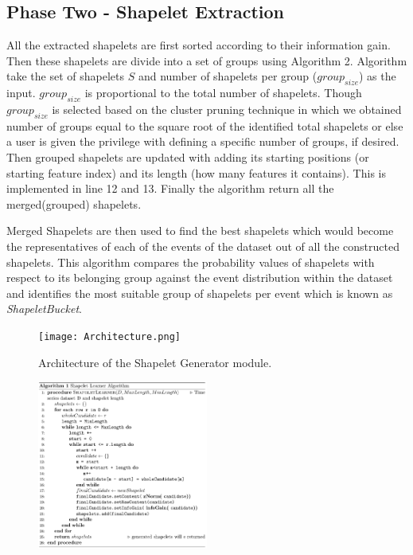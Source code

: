 \documentclass[conference]{IEEEtran}  %
\begin{document}
\subsection{Phase Two - Shapelet Extraction}
All the extracted shapelets are first sorted according to their information gain. Then these shapelets are divide into a set of groups using Algorithm 2. Algorithm take the set of shapelets $S$ and number of shapelets per group ($group_{size}$) as the input. $group_{size}$ is proportional to the total number of shapelets. Though $group_{size}$ is selected based on the cluster pruning technique in which we obtained number of groups equal to the square root of the identified total shapelets or else a user is given the privilege with defining a specific number of groups, if desired. Then grouped shapelets are updated with adding its starting positions (or starting feature index) and its length (how many features it contains). This is implemented in line 12 and 13. Finally the algorithm return all the merged(grouped) shapelets.

Merged Shapelets are then used to find the best shapelets which would become the representatives of each of the events of the dataset out of all the constructed shapelets. This algorithm compares the probability values of shapelets with respect to its belonging group against the event distribution within the dataset and identifies the most suitable group of shapelets per event which is known as \textit{ShapeletBucket}.

\begin{figure}
\texttt{[image: Architecture.png]}
\caption{Architecture of the Shapelet Generator module.}
\label{fig:hintgen}
\end{figure}

\begin{figure}
\includegraphics[width=0.5\textwidth]{algo1.png}
\label{fig:algo1}
\end{figure}
\end{document}
